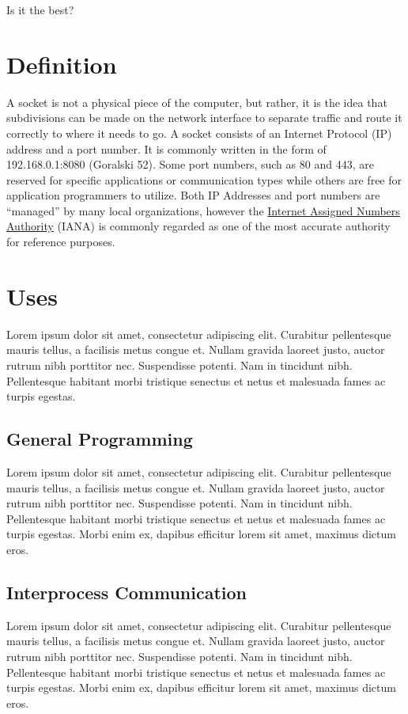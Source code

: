 \documentclass[conference, 12pt]{IEEEtran}
\begin{document}
Is it the best?


\section{Definition}
A socket is not a physical piece of the computer, but rather, it is the idea that subdivisions can be made on the network interface to separate traffic and route it correctly to where it needs to go. A socket consists of an Internet Protocol (IP) address and a port number. It is commonly written in the form of 192.168.0.1:8080 (Goralski 52). Some port numbers, such as 80 and 443, are reserved for specific applications or communication types while others are free for application programmers to utilize. Both IP Addresses and port numbers are “managed” by many local organizations, however the \href{https://www.iana.org/}{Internet Assigned Numbers Authority} (IANA) is commonly regarded as one of the most accurate authority for reference purposes.

\section{Uses}
Lorem ipsum dolor sit amet, consectetur adipiscing elit. Curabitur pellentesque mauris tellus, a facilisis metus congue et. Nullam gravida laoreet justo, auctor rutrum nibh porttitor nec. Suspendisse potenti. Nam in tincidunt nibh. Pellentesque habitant morbi tristique senectus et netus et malesuada fames ac turpis egestas.

\subsection{General Programming}
Lorem ipsum dolor sit amet, consectetur adipiscing elit. Curabitur pellentesque mauris tellus, a facilisis metus congue et. Nullam gravida laoreet justo, auctor rutrum nibh porttitor nec. Suspendisse potenti. Nam in tincidunt nibh. Pellentesque habitant morbi tristique senectus et netus et malesuada fames ac turpis egestas. Morbi enim ex, dapibus efficitur lorem sit amet, maximus dictum eros.

\subsection{Interprocess Communication}
Lorem ipsum dolor sit amet, consectetur adipiscing elit. Curabitur pellentesque mauris tellus, a facilisis metus congue et. Nullam gravida laoreet justo, auctor rutrum nibh porttitor nec. Suspendisse potenti. Nam in tincidunt nibh. Pellentesque habitant morbi tristique senectus et netus et malesuada fames ac turpis egestas. Morbi enim ex, dapibus efficitur lorem sit amet, maximus dictum eros.
\end{document}
